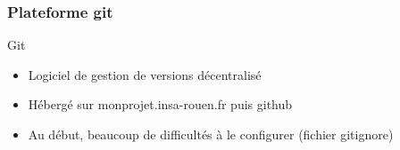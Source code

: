 \begin{frame}
    \frametitle{Plateforme git}
    		\begin{block}{Git}
    			\begin{itemize}
    				\item Logiciel de gestion de versions décentralisé
    				\item Hébergé sur monprojet.insa-rouen.fr puis github
    				\item Au début, beaucoup de difficultés à le configurer (fichier gitignore) 
    			\end{itemize}
    		\end{block}
  

\end{frame}